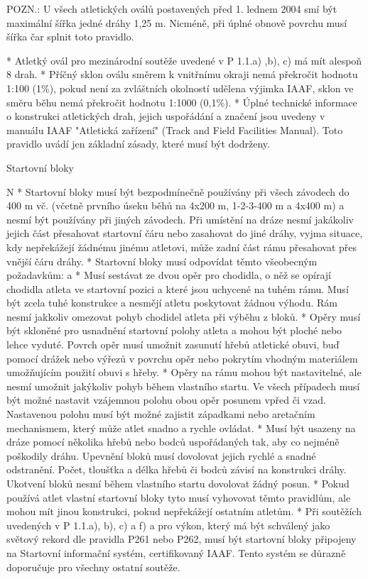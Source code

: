 POZN.: U všech atletických oválů postavených před 1. lednem 2004 smí být maximální šířka jedné dráhy 1,25 m. Nicméně, při úplné obnově povrchu musí šířka čar splnit toto pravidlo.

* Atletký ovál pro mezinárodní soutěže uvedené v P 1.1.a) ,b), c) má mít alespoň 8 drah.
* Příčný sklon oválu směrem k vnitřnímu okraji nemá překročit hodnotu 1:100 (1\%), pokud není za zvláštních okolností udělena výjimka IAAF, sklon ve směru běhu nemá překročit hodnotu 1:1000  (0,1\%).
* Úplné technické informace o konstrukci atletických drah, jejich uspořádání a značení jsou uvedeny v manuálu IAAF "Atletická zařízení" (Track and Field Facilities Manual). Toto pravidlo uvádí jen základní zásady, které musí být dodrženy.
\enditems

\secc Startovní bloky

\begitems \style N
* Startovní bloky musí být bezpodmínečně používány při všech závodech do 400 m vč. (včetně prvního úseku běhů na 4x200 m, 1-2-3-400 m a 4x400 m) a nesmí být používány při jiných závodech. Při umístění na dráze nesmí jakákoliv jejich část přesahovat startovní čáru nebo zasahovat do jiné dráhy, vyjma situace, kdy nepřekážejí žádnému jinému atletovi, může zadní část rámu přesahovat přes vnější čáru dráhy.
* Startovní  bloky musí odpovídat těmto všeobecným požadavkům:
  \begitems \style a
  * Musí sestávat ze dvou opěr pro chodidla, o něž se opírají chodidla atleta ve startovní pozici a které jsou uchycené na tuhém rámu. Musí být zcela tuhé konstrukce a nesmějí atletu poskytovat žádnou výhodu. Rám nesmí jakkoliv omezovat pohyb chodidel atleta při výběhu z bloků.
  * Opěry musí být skloněné pro usnadnění startovní polohy atleta a mohou být ploché nebo lehce vyduté. Povrch opěr musí umožnit zasunutí hřebů atletické obuvi, buď pomocí drážek nebo výřezů v povrchu opěr nebo pokrytím vhodným materiálem umožňujícím použití obuvi s hřeby.
  * Opěry na rámu mohou být nastavitelné, ale nesmí umožnit jakýkoliv pohyb během vlastního startu. Ve všech případech musí být možné nastavit vzájemnou polohu obou opěr posunem vpřed či vzad. Nastavenou polohu musí být možné zajistit západkami nebo aretačním mechanismem, který může atlet snadno a rychle ovládat.
  * Musí být usazeny na dráze pomocí několika hřebů nebo bodců uspořádaných tak, aby co nejméně poškodily dráhu. Upevnění bloků musí dovolovat jejich rychlé a snadné odstranění. Počet, tloušťka a délka hřebů či bodců závisí na konstrukci dráhy. Ukotvení bloků nesmí během vlastního startu dovolovat žádný posun.
  * Pokud používá atlet vlastní startovní bloky tyto musí vyhovovat těmto pravidlům, ale mohou mít jinou konstrukci, pokud nepřekážejí ostatním atletům.
  \enditems
* Při soutěžích uvedených v P 1.1.a), b), c) a f) a pro výkon, který má být schválený jako světový rekord dle pravidla P261 nebo P262, musí být startovní bloky připojeny na Startovní informační systém, certifikovaný IAAF. Tento systém se důrazně doporučuje pro všechny ostatní soutěže.

